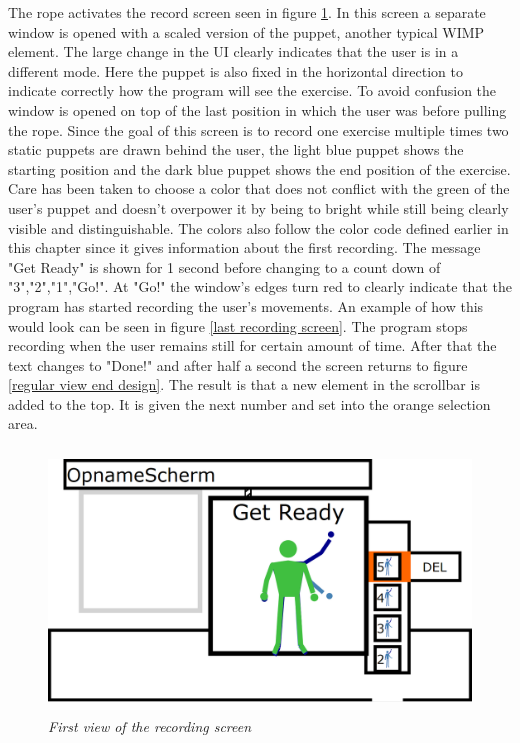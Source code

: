 The rope activates the record screen seen in figure \ref{first recording screen}. In this screen a separate window is opened with a scaled version of the puppet, another typical WIMP element. The large change in the UI clearly indicates that the user is in a different mode. Here the puppet is also fixed in the horizontal direction to indicate correctly how the program will see the exercise. To avoid confusion the window is opened on top of the last position in which the user was before pulling the rope. Since the goal of this screen is to record one exercise multiple times two static puppets are drawn behind the user, the light blue puppet shows the starting position and the dark blue puppet shows the end position of the exercise. Care has been taken to choose a color that does not conflict with the green of the user's puppet and doesn't overpower it by being to bright while still being clearly visible and distinguishable. The colors also follow the color code defined earlier in this chapter since it gives information about the first recording. The message "Get Ready" is shown for 1 second before changing to a count down of "3","2","1","Go!". At "Go!" the window's edges turn red to clearly indicate that the program has started recording the user's movements. An example of how this would look can be seen in figure \ref{last recording screen}. The program stops recording when the user remains still for certain amount of time. After that the text changes to "Done!" and after half a second the screen returns to figure  \ref{regular view end design}. The result is that a new element in the scrollbar is added to the top. It is given the next number and set into the orange selection area.\\

\begin{figure}[H]
	\begin{center}
		\includegraphics[width=12.5cm, height=7cm]{figures/4_record_getready.png}
		\caption{\emph{First view of the recording screen}}
		\label{first recording screen}
	\end{center}
\end{figure}

